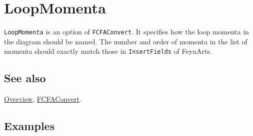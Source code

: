 \documentclass[../FeynCalcManual.tex]{subfiles}
\begin{document}
\hypertarget{loopmomenta}{
\section{LoopMomenta}\label{loopmomenta}}

\texttt{LoopMomenta} is an option of \texttt{FCFAConvert}. It specifies
how the loop momenta in the diagram should be named. The number and
order of momenta in the list of momenta should exactly match those in
\texttt{InsertFields} of FeynArts.

\subsection{See also}

\hyperlink{toc}{Overview}, \hyperlink{fcfaconvert}{FCFAConvert}.

\subsection{Examples}
\end{document}
